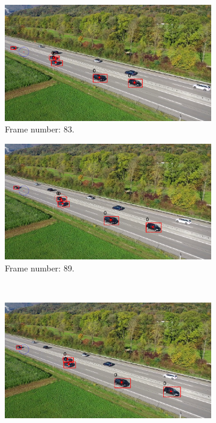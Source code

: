 \begin{figure}[H]
    \centering
    \begin{subfigure}{0.48\textwidth}
        \centering
        \includegraphics[width=\linewidth]{../../../experiments/E1/V2/DINO/83}
        \caption{Frame number: 83.}
        \label{fig:E1-V2-S3:01}
    \end{subfigure}
    \begin{subfigure}{0.48\textwidth}
        \centering
        \includegraphics[width=\linewidth]{../../../experiments/E1/V2/DINO/89}
        \caption{Frame number: 89.}
        \label{fig:E1-V2-S3:02}
    \end{subfigure}
    \\
    \begin{subfigure}{0.48\textwidth}
        \centering
        \includegraphics[width=\linewidth]{../../../experiments/E1/V2/DINO/94}

\end{subfigure}
\end{figure}
